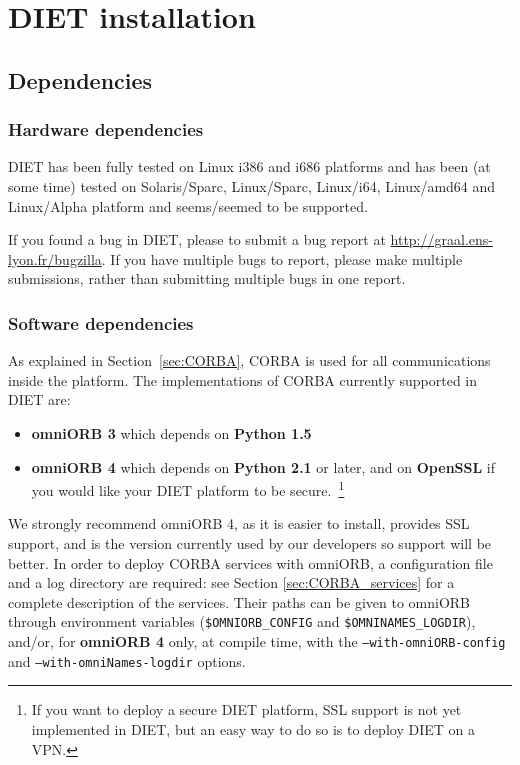 \chapter{DIET installation}
\label{ch:installing}

\section{Dependencies}
\label{sec:dependencies}

\subsection{Hardware dependencies}

DIET has been fully tested on Linux i386 and i686 platforms and has 
been (at some time) tested on Solaris/Sparc, Linux/Sparc, Linux/i64,
Linux/amd64 and Linux/Alpha platform and seems/seemed to be supported.

If you found a bug in DIET, please to submit a bug report at
\url{http://graal.ens-lyon.fr/bugzilla}. If you have multiple bugs
to report, please make multiple submissions, rather than submitting
multiple bugs in one report.

\subsection{Software dependencies}

As explained in Section~\ref{sec:CORBA}, CORBA is used for all
communications inside the platform. The implementations of CORBA
currently supported in DIET are:
\begin{itemize}
 \item{\textbf{omniORB 3}} which depends on \textbf{Python 1.5}
 \item{\textbf{omniORB 4}} which depends on \textbf{Python 2.1} or
                           later, and on \textbf{OpenSSL} if you would
                           like your DIET platform to be
                           secure.~\footnote{If you want to deploy a
                           secure DIET platform, SSL support is not
                           yet implemented  in DIET, but an easy way
                           to do so is to deploy DIET on a VPN.}
\end{itemize}
We strongly recommend omniORB 4, as it is easier to install,
provides SSL support, and is the version currently used by our
developers so support will be better. In order to deploy CORBA
services with omniORB, a configuration file and a log directory are
required: see Section
\ref{sec:CORBA_services} for a complete description of the services.
Their paths can be given to omniORB through environment variables
(\texttt{\$OMNIORB\_CONFIG} and \texttt{\$OMNINAMES\_LOGDIR}), and/or,
for \textbf{omniORB 4} only, at compile time, with the
\texttt{--with-omniORB-config} and \texttt{--with-omniNames-logdir}
options.

